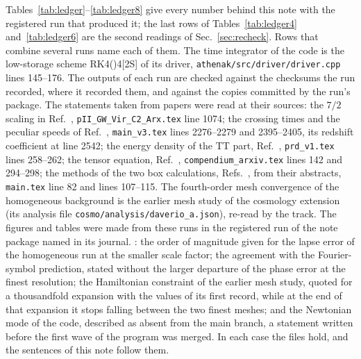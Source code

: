 \documentclass[aps,prd,twocolumn,10pt,superscriptaddress,nofootinbib,longbibliography,floatfix]{revtex4-2}
\begin{document}
Tables~\ref{tab:ledger}--\ref{tab:ledger8} give every number behind this note with the registered run that produced it; the last rows of Tables~\ref{tab:ledger4} and~\ref{tab:ledger6} are the second readings of Sec.~\ref{sec:recheck}. Rows that combine several runs name each of them. The time integrator of the code is the low-storage scheme RK4()4[2S] of its driver, \texttt{athenak/src/driver/driver.cpp} lines 145--176. The outputs of each run are checked against the checksums the run recorded, where it recorded them, and against the copies committed by the run's package. The statements taken from papers were read at their sources: the $7/2$ scaling in Ref.~\cite{Dalianis:2024gw}, \texttt{pII\_GW\_Vir\_C2\_Arx.tex} line 1074; the crossing times and the peculiar speeds of Ref.~\cite{Escriva:2026gw}, \texttt{main\_v3.tex} lines 2276--2279 and 2395--2405, its redshift coefficient at line 2542; the energy density of the TT part, Ref.~\cite{Ota:2021tt}, \texttt{prd\_v1.tex} lines 258--262; the tensor equation, Ref.~\cite{Adamek:2016gevolution}, \texttt{compendium\_arxiv.tex} lines 142 and 294--298; the methods of the two box calculations, Refs.~\cite{Eggemeier:2022gw,Fernandez:2023gw}, from their abstracts, \texttt{main.tex} line 82 and lines 107--115. The fourth-order mesh convergence of the homogeneous background is the earlier mesh study of the cosmology extension (its analysis file \texttt{cosmo/analysis/daverio\_a.json}), re-read by the track. The figures and tables were made from these runs in the registered run of the note package named in its journal. : the order of magnitude given for the lapse error of the homogeneous run at the smaller scale factor; the agreement with the Fourier-symbol prediction, stated without the larger departure of the phase error at the finest resolution; the Hamiltonian constraint of the earlier mesh study, quoted for a thousandfold expansion with the values of its first record, while at the end of that expansion it stops falling between the two finest meshes; and the Newtonian mode of the code, described as absent from the main branch, a statement written before the first wave of the program was merged. In each case the files hold, and the sentences of this note follow them.




\end{document}
